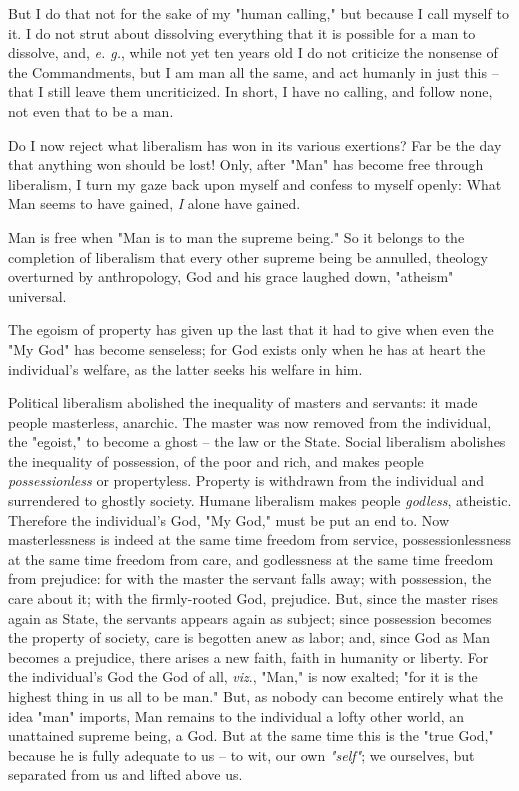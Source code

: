 \documentclass[a4paper]{book}
\begin{document}
But I do that not for the sake of my "{}human calling,"{} but because I call 
myself to it. I do not strut about dissolving everything that it is possible 
for a man to dissolve, and, \textit{e. g.}, while not yet ten years old I do 
not criticize the nonsense of the Commandments, but I am man all the same, and 
act humanly in just this -- that I still leave them uncriticized. In short, I 
have no calling, and follow none, not even that to be a man.

Do I now reject what liberalism has won in its various exertions? Far be the 
day that anything won should be lost! Only, after "{}Man"{} has become free 
through liberalism, I turn my gaze back upon myself and confess to myself 
openly: What Man seems to have gained, \textit{I} alone have gained.

Man is free when "{}Man is to man the supreme being."{} So it belongs to the 
completion of liberalism that every other supreme being be annulled, theology 
overturned by anthropology, God and his grace laughed down, "{}atheism"{} 
universal.

The egoism of property has given up the last that it had to give when even the 
"{}My God"{} has become senseless; for God exists only when he has at heart 
the individual's welfare, as the latter seeks his welfare in him.

Political liberalism abolished the inequality of masters and servants: it made 
people masterless, anarchic. The master was now removed from the individual, 
the "{}egoist,"{} to become a ghost -- the law or the State. Social liberalism 
abolishes the inequality of possession, of the poor and rich, and makes people 
\textit{possessionless} or propertyless. Property is withdrawn from the 
individual and surrendered to ghostly society. Humane liberalism makes people 
\textit{godless}, atheistic. Therefore the individual's God, "{}My God,"{} 
must be put an end to. Now masterlessness is indeed at the same time freedom 
from service, possessionlessness at the same time freedom from care, and 
godlessness at the same time freedom from prejudice: for with the master the 
servant falls away; with possession, the care about it; with the firmly-rooted 
God, prejudice. But, since the master rises again as State, the servants 
appears again as subject; since possession becomes the property of society, 
care is begotten anew as labor; and, since God as Man becomes a prejudice, 
there arises a new faith, faith in humanity or liberty. For the individual's 
God the God of all, \textit{viz}., "{}Man,"{} is now exalted; "{}for it is the 
highest thing in us all to be man."{} But, as nobody can become entirely what 
the idea "{}man"{} imports, Man remains to the individual a lofty other world, 
an unattained supreme being, a God. But at the same time this is the "{}true 
God,"{} because he is fully adequate to us -- to wit, our own 
\textit{"{}self"{}}; we ourselves, but separated from us and lifted above us.
\end{document}
